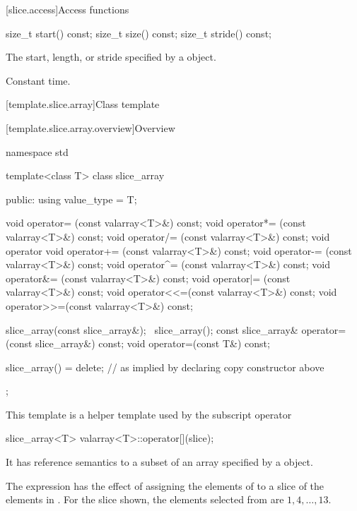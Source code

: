[slice.access]{Access functions}
%
%
%
\begin{itemdecl}
size_t start() const;
size_t size() const;
size_t stride() const;
\end{itemdecl}

\begin{itemdescr}
\pnum
\returns The start, length, or stride specified
by a  object.

\pnum
\complexity Constant time.
\end{itemdescr}

[template.slice.array]{Class template }

[template.slice.array.overview]{Overview}

%
%
\begin{codeblock}
namespace std {
  template<class T> class slice_array {
  public:
    using value_type = T;

    void operator=  (const valarray<T>&) const;
    void operator*= (const valarray<T>&) const;
    void operator/= (const valarray<T>&) const;
    void operator%
    void operator+= (const valarray<T>&) const;
    void operator-= (const valarray<T>&) const;
    void operator^= (const valarray<T>&) const;
    void operator&= (const valarray<T>&) const;
    void operator|= (const valarray<T>&) const;
    void operator<<=(const valarray<T>&) const;
    void operator>>=(const valarray<T>&) const;

    slice_array(const slice_array&);
    ~slice_array();
    const slice_array& operator=(const slice_array&) const;
    void operator=(const T&) const;

    slice_array() = delete;       // as implied by declaring copy constructor above
  };
}
\end{codeblock}

\pnum
This template is a helper template used by the
 subscript operator
\begin{codeblock}
slice_array<T> valarray<T>::operator[](slice);
\end{codeblock}

\pnum
It has reference semantics to a subset of an array specified by a
object.
\begin{example}
The expression
has the effect of assigning the elements of
to a slice of the elements in
.
For the slice shown, the elements
selected from
are $1, 4, \dotsc, 13$.
\end{example}

